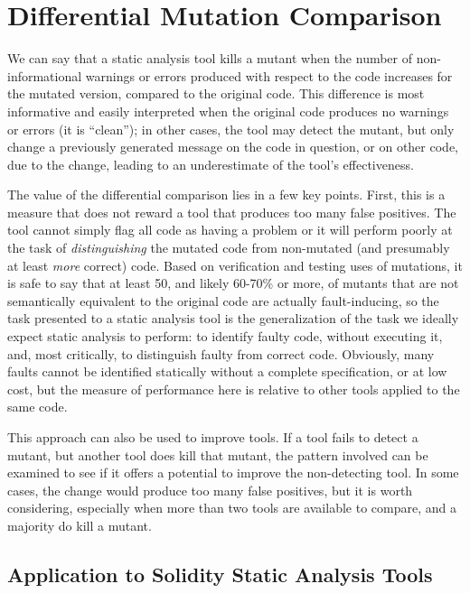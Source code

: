 \documentclass{article}
\begin{document}
\section{Differential Mutation Comparison}

We can say that a static analysis tool kills a mutant when the number of non-informational warnings or errors produced with respect to the code increases for the mutated version, compared to the original code.  This difference is most informative and easily interpreted when the original code produces no warnings or errors (it is ``clean''); in other cases, the tool may detect the mutant, but only change a previously generated message on the code in question, or on other code, due to the change, leading to an underestimate of the tool's effectiveness.

The value of the differential comparison lies in a few key points.  First, this is a measure that does not reward a tool that produces too many false positives.  The tool cannot simply flag all code as having a problem or it will perform poorly at the task of \emph{distinguishing} the mutated code from non-mutated (and presumably at least \emph{more} correct) code.  Based on verification and testing uses of mutations, it is safe to say that at least 50, and likely 60-70\% or more, of mutants that are not semantically equivalent to the original code are actually fault-inducing, so the task presented to a static analysis tool is the generalization of the task we ideally expect static analysis to perform:  to identify faulty code, without executing it, and, most critically, to distinguish faulty from correct code.  Obviously, many faults cannot be identified statically without a complete specification, or at low cost, but the measure of performance here is relative to other tools applied to the same code.

This approach can also be used to improve tools.  If a tool fails to detect a mutant, but another tool does kill that mutant, the pattern involved can be examined to see if it offers a potential to improve the non-detecting tool.  In some cases, the change would produce too many false positives, but it is worth considering, especially when more than two tools are available to compare, and a majority do kill a mutant.

\subsection{Application to Solidity Static Analysis Tools}
\end{document}
